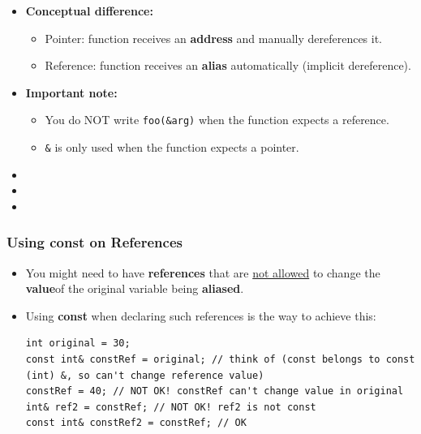 \documentclass[10pt]{article}
\newcommand{\pbreak}{\vspace{30pt}}
\begin{document}
\begin{itemize}
\pbreak

\item \textbf{Conceptual difference:}
\begin{itemize}
    \item Pointer: function receives an \textbf{address} and manually dereferences it.
    \item Reference: function receives an \textbf{alias} automatically (implicit dereference).
\end{itemize}

\pbreak

\item \textbf{Important note:}
\begin{itemize}
    \item You do NOT write \verb|foo(&arg)| when the function expects a reference.
    \item \verb|&| is only used when the function expects a pointer.
\end{itemize}

\end{itemize}

\newpage

\begin{itemize}
	\item {}
	\item {}
	\item {}
\end{itemize}

\pbreak

\subsubsection{Using const on References}
\begin{itemize}
	\item You might need to have \textbf{references} that are \underline{not allowed} to change the \textbf{value}of the original variable being \textbf{aliased}.

	\item Using \textbf{const} when declaring such references is the way to achieve this:

		\begin{verbatim}
int original = 30;
const int& constRef = original; // think of (const belongs to const (int) &, so can't change reference value)
constRef = 40; // NOT OK! constRef can't change value in original
int& ref2 = constRef; // NOT OK! ref2 is not const
const int& constRef2 = constRef; // OK
		\end{verbatim}
\end{itemize}
\end{document}
